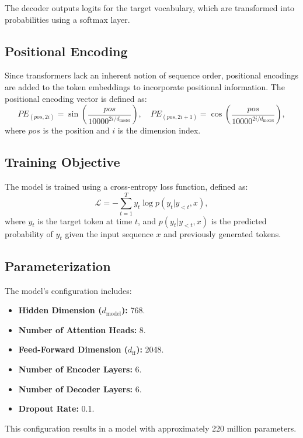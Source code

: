 \documentclass{article}
\begin{document}
The decoder outputs logits for the target vocabulary, which are transformed into probabilities using a softmax layer.

\subsection{Positional Encoding}

Since transformers lack an inherent notion of sequence order, positional encodings are added to the token embeddings to incorporate positional information. The positional encoding vector is defined as:
\[
PE_{(pos, 2i)} = \sin\left(\frac{pos}{10000^{2i/d_{\text{model}}}}\right), \quad PE_{(pos, 2i+1)} = \cos\left(\frac{pos}{10000^{2i/d_{\text{model}}}}\right),
\]
where $pos$ is the position and $i$ is the dimension index.

\subsection{Training Objective}

The model is trained using a cross-entropy loss function, defined as:
\[
\mathcal{L} = -\sum_{t=1}^T y_t \log p(y_t|y_{<t}, x),
\]
where $y_t$ is the target token at time $t$, and $p(y_t|y_{<t}, x)$ is the predicted probability of $y_t$ given the input sequence $x$ and previously generated tokens.

\subsection{Parameterization}

The model's configuration includes:
\begin{itemize}
    \item \textbf{Hidden Dimension ($d_{\text{model}}$):} 768.
    \item \textbf{Number of Attention Heads:} 8.
    \item \textbf{Feed-Forward Dimension ($d_{\text{ff}}$):} 2048.
    \item \textbf{Number of Encoder Layers:} 6.
    \item \textbf{Number of Decoder Layers:} 6.
    \item \textbf{Dropout Rate:} 0.1.
\end{itemize}

This configuration results in a model with approximately 220 million parameters.

\end{document}
